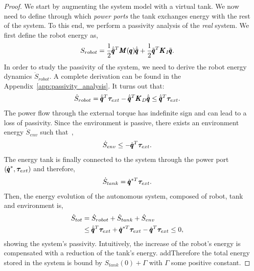\begin{proof}
We start by augmenting the system model with a virtual tank. We now need to define through which \emph{power ports} the tank exchanges energy with the rest of the system. To this end, we perform a passivity analysis of the \emph{real} system. We first define the robot energy as, 
\begin{equation}
    S_{robot} = \frac{1}{2} \dot{\tilde{\pmb{q}}}^T \pmb{M}(\pmb{q}) \dot{\tilde{\pmb{q}}} + \frac{1}{2} \tilde{\pmb{q}}^T \pmb{K}_I \tilde{\pmb{q}}.
\end{equation}
In order to study the passivity of the system, we need to derive the robot energy dynamics $\dot{S}_{robot}$. A complete derivation can be found in the Appendix~\ref{app:passivity_analysis}. It turns out that:
\begin{equation}
    \dot{S}_{robot} = \dot{\tilde{\pmb{q}}}^T \boldsymbol{\tau}_{ext} - \dot{\tilde{\pmb{q}}}^T \pmb{K}_D \dot{\tilde{\pmb{q}}} \leq \dot{\tilde{\pmb{q}}}^T \boldsymbol{\tau}_{ext}. 
\end{equation}
The power flow through the external torque has indefinite sign and can lead to a loss of passivity. Since the environment is passive, there exists an environment energy $\dot{S}_{env}$ such that~\cite{shahriari2018valve},
\begin{equation}
    \dot{S}_{env} \leq -\dot{\pmb{q}}^T \boldsymbol{\tau}_{ext}.
\end{equation}
The energy tank is finally connected to the system through the power port $(\dot{\pmb{q}}^*, \boldsymbol{\tau}_{ext})$ and therefore,
\begin{equation} \label{eq:tank_dynamics}
\dot{S}_{tank} = \dot{\pmb{q}}^{*T} \boldsymbol{\tau}_{ext}. 
\end{equation}
Then, the energy evolution of the autonomous system, composed of robot, tank and environment is,
\begin{equation} 
\begin{aligned} \label{eq:autonomous_sys_energy}
    \dot{S}_{tot} &= \dot{S}_{robot} + \dot{S}_{tank} + \dot{S}_{env} \\
    &\leq \dot{\tilde{\pmb{q}}}^T \boldsymbol{\tau}_{ext} + \dot{\pmb{q}}^{*T} \boldsymbol{\tau}_{ext} - \dot{\pmb{q}}^T \boldsymbol{\tau}_{ext} \leq 0,
\end{aligned}
\end{equation}
showing the system's passivity.
Intuitively, the increase of the robot's energy is compensated with a reduction of the tank's energy. 
add{Therefore the total energy stored in the system is bound by $S_{tank}(0) + \Gamma$ with $
\Gamma$ some positive constant.} \add{}

\end{proof}
